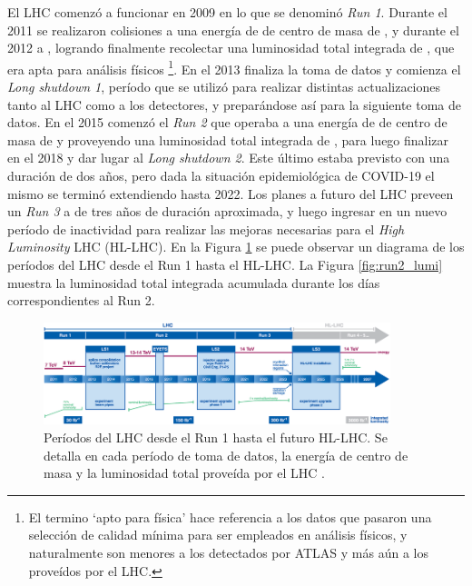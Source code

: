 El LHC comenzó a funcionar en 2009 en lo que se denominó \textit{Run 1}. Durante el 2011 se realizaron colisiones a una energía de de centro de masa de , y durante el 2012 a , logrando finalmente recolectar una luminosidad total integrada de  \cite{DAPR-2011-01,DAPR-2013-01}, que era apta para análisis físicos \footnote{El termino `apto para física' hace referencia a los datos que pasaron una selección de calidad mínima para ser empleados en análisis físicos, y naturalmente son menores a los detectados por ATLAS y más aún a los proveídos por el LHC.}. En el 2013 finaliza la toma de datos y comienza el \textit{Long shutdown 1}, período que se utilizó para realizar distintas actualizaciones tanto al LHC como a los detectores, y preparándose así para la siguiente toma de datos. En el 2015 comenzó el \textit{Run 2} que operaba a una energía de de centro de masa de  y proveyendo una luminosidad total integrada de  \cite{lumi_13tev}, para luego finalizar en el 2018 y dar lugar al \textit{Long shutdown 2}. Este último estaba previsto con una duración de dos años, pero dada la situación epidemiológica de COVID-19 el mismo se terminó extendiendo hasta 2022.
Los planes a futuro del LHC preveen un \textit{Run 3} a  de tres años de duración aproximada, y luego ingresar en un nuevo período de inactividad para realizar las mejoras necesarias para el \textit{High Luminosity} LHC (HL-LHC). En la Figura \ref{fig:lhc_periods} se puede observar un diagrama de los períodos del LHC desde el Run 1 hasta el HL-LHC. La Figura \ref{fig:run2_lumi} muestra la luminosidad total integrada acumulada durante los días correspondientes al Run 2.

\begin{figure}
  \centering
  \includegraphics[width=0.9\textwidth]{images/lhc/lhc_periods.png}
  \caption{Períodos del LHC desde el Run 1 hasta el futuro HL-LHC. Se detalla en cada período de toma de datos, la energía de centro de masa y la luminosidad total proveída por el LHC \cite{lhc_periods}.}
  \label{fig:lhc_periods}
\end{figure}

